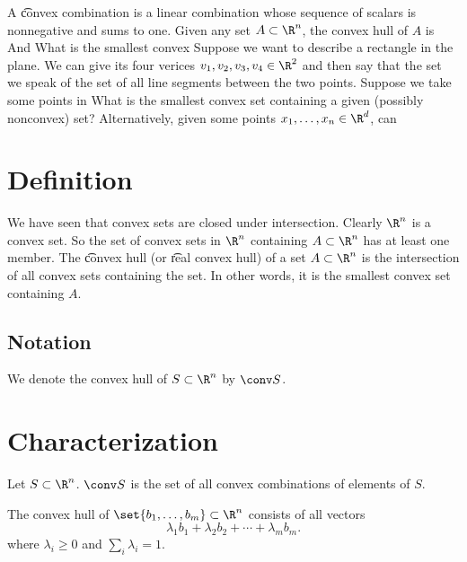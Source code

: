 A \t{convex combination} is a linear combination whose sequence of scalars is nonnegative and sums to one.
Given any set $A \subset \R ^n$, the convex hull of $A$ is
And
What is the smallest convex
Suppose we want to describe a rectangle in the plane.
We can give its four verices $v_1, v_2, v_3, v_4 \in \R ^2$ and then say that the set we speak of the set of all line
segments between the two points.
Suppose we take some points in
What is the smallest convex set containing a given (possibly nonconvex) set?
Alternatively, given some points $x_1, \dots , x_n \in \R ^d$, can
        \section*{Definition}

We have seen that convex sets are closed under intersection.
Clearly $\R ^n$ is a convex set.
So the set of convex sets in $\R ^n$ containing $A \subset \R ^n$ has at least one member.
The \t{convex hull} (or \t{real convex hull}) of a set $A \subset \R ^n$ is the intersection of all convex sets containing the set.
In other words, it is the smallest convex set containing $A$.

        \subsection*{Notation}

We denote the convex hull of $S \subset \R ^n$ by $\conv S$.

        \section*{Characterization}

\begin{proposition}
Let $S \subset \R ^n$. $\conv S$ is the set of all convex combinations of elements of $S$.
\end{proposition}

\begin{proposition}
The convex hull of $\set{b_1, \dots , b_m} \subset \R ^n$ consists of all vectors
\[
\lambda _1b_1 + \lambda _2b_2 + \cdots + \lambda _mb_m.
\]
where $\lambda _i \geq 0$ and $\sum_{i}\lambda _i = 1$.
\end{proposition}

\blankpage

